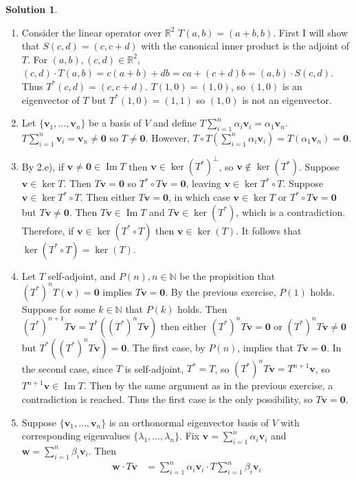 \documentclass[11pt]{article}
\theoremstyle{definition}
\newtheorem*{solution}{Solution}
\newcommand{\R}{\mathbb{R}}
\newcommand{\N}{\mathbb{N}}
\DeclareMathOperator{\im}{Im}
\newcommand{\vv}{\mathbf{v}}
\newcommand{\vw}{\mathbf{w}}
\newcommand{\vzero}{\mathbf{0}}
\begin{document}
\begin{solution}
\begin{enumerate}[label = \alph*)]
            \item Consider the linear operator over $\R^2$ $T(a,b) = (a+b, b)$. First I will show that $S(c,d) = (c, c+d)$ with the canonical inner product is the adjoint of $T$. For $(a,b), (c,d) \in \R^2$, $(c,d) \cdot T(a,b) = c(a+b) + db = ca + (c+d)b = (a,b) \cdot S(c,d)$. Thus $T^*(c,d) = (c, c+d)$. $T(1,0) = (1,0)$, so $(1,0)$ is an eigenvector of $T$ but $T^*(1,0) = (1,1)$ so $(1,0)$ is not an eigenvector.
            \item Let $\{\vv_1, \dots, \vv_n\}$ be a basis of $V$ and define $T\sum_{i=1}^n \alpha_i \vv_i = \alpha_1 \vv_n$. $T\sum_{i=1}^n \vv_i = \vv_n \neq \vzero$ so $T \neq \vzero$. However, $T\circ T(\sum_{i=1}^n \alpha_i \vv_i) = T(\alpha_1 \vv_n) = \vzero$.
            \item By 2.e), if $\vv \neq \vzero \in \im T$ then $\vv \in \ker(T^*)^{\perp}$, so $\vv \not \in \ker(T^*)$. Suppose $\vv \in \ker T$. Then $T\vv = \vzero$ so $T^* \circ T\vv = \vzero$, leaving $\vv \in \ker T^* \circ T$. Suppose $\vv \in \ker T^* \circ T$. Then either $T\vv = \vzero$, in which case $\vv \in \ker T$ or $T^* \circ T\vv = \vzero$ but $T\vv \neq \vzero$. Then $T\vv \in \im T$ and $T\vv \in \ker(T^*)$, which is a contradiction. Therefore, if $\vv \in \ker(T^* \circ T)$ then $\vv \in \ker(T)$. It follows that $\ker(T^* \circ T) = \ker(T)$.
            \item Let $T$ self-adjoint, and $P(n), n \in \N$ be the propisition that $(T^*)^n T(\vv) = \vzero$ implies $T\vv = \vzero$. By the previous exercise, $P(1)$ holds. Suppose for some $k \in \N$ that $P(k)$ holds. Then $(T^*)^{n+1} T\vv = T^* ((T^*)^n T\vv)$ then either $(T^*)^n T\vv = \vzero$ or $(T^*)^n T\vv \neq \vzero$ but $T^* ((T^*)^n T\vv) = \vzero$. The first case, by $P(n)$, implies that $T\vv = \vzero$. In the second case, since $T$ is self-adjoint, $T^* = T$, so $(T^*)^n T\vv = T^{n+1}\vv$, so $T^{n+1} \vv \in \im T$. Then by the same argument as in the previous exercise, a contradiction is reached. Thus the first case is the only possibility, so $T\vv = \vzero$. 
            \item Suppose $\{\vv_1, \dots, \vv_n\}$ is an orthonormal eigenvector basis of $V$ with corresponding eigenvalues $\{\lambda_1, \dots, \lambda_n\}$. Fix $\vv = \sum_{i=1}^n \alpha_i \vv_i$ and $\vw = \sum_{i=1}^n \beta_i \vv_i$. Then 
            \begin{align*}
                \vw \cdot T\vv &= \sum_{i=1}^n \alpha_i \vv_i \cdot T\sum_{i=1}^n \beta_i \vv_i\\

\end{align*}
\end{enumerate}
\end{solution}
\end{document}
